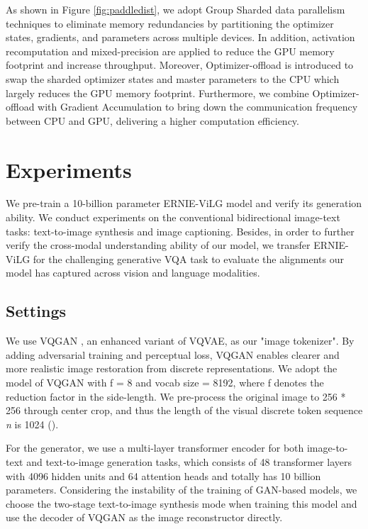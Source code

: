 \documentclass{article}
\begin{document}
As shown in Figure \ref{fig:paddledist}, we adopt Group Sharded data parallelism techniques \cite{rajbhandari2020ZeRO, yulong2021adaptive} to eliminate memory redundancies by partitioning the optimizer states, gradients, and parameters across multiple devices. In addition, activation recomputation \cite{chen2016recomputation} and mixed-precision \cite{micikevicius2017amp} are applied to reduce the GPU memory footprint and increase throughput. Moreover, Optimizer-offload \cite{rajbhandari2021ZeRO-offload} is introduced to swap the sharded optimizer states and master parameters to the CPU which largely reduces the GPU memory footprint. Furthermore, we combine Optimizer-offload with Gradient Accumulation to bring down the communication frequency between CPU and GPU, delivering a higher computation efficiency.


\section{Experiments}
 We pre-train a 10-billion parameter ERNIE-ViLG model and verify its generation ability. We conduct experiments on the conventional bidirectional image-text tasks: text-to-image synthesis and image captioning. Besides, in order to further verify the cross-modal understanding ability of our model, we transfer ERNIE-ViLG for the challenging generative VQA task to evaluate the alignments our model has captured across vision and language modalities. 

\subsection{Settings}
We use VQGAN \cite{esser2021taming}, an enhanced variant of VQVAE, as our "image tokenizer". By adding adversarial training and perceptual loss, VQGAN enables clearer and more realistic image restoration from discrete representations. We adopt the model of VQGAN with f = 8 and vocab size = 8192, where f denotes the reduction factor in the side-length. We pre-process the original image to 256 * 256 through center crop, and thus the length of the visual discrete token sequence \textit{n} is 1024 (). 

For the generator, we use a multi-layer transformer encoder for both image-to-text and text-to-image generation tasks, which consists of 48 transformer layers with 4096 hidden units and 64 attention heads and totally has 10 billion parameters. Considering the instability of the training of GAN-based models, we choose the two-stage text-to-image synthesis mode when training this model and use the decoder of VQGAN as the image reconstructor directly.
\end{document}
